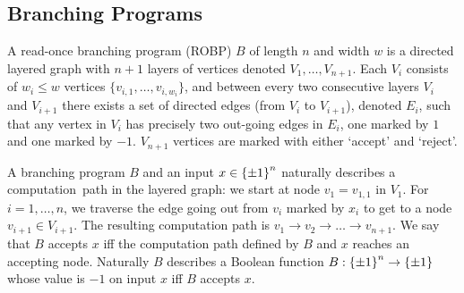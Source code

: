 
	



\subsection{Branching Programs}
A {\sf read-once branching program (ROBP)} $B$ of {\sf length} $n$ and {\sf width} $w$ is a directed layered graph with $n+1$ layers of vertices denoted $V_1, \ldots, V_{n+1}$.  Each $V_i$ consists of $w_i \le w$ vertices $\{v_{i,1}, \ldots, v_{i,w_i}\}$, and between every two consecutive layers $V_i$ and $V_{i+1}$ there exists a set of directed edges (from $V_i$ to $V_{i+1}$), denoted $E_i$, such that any vertex in $V_i$ has precisely two out-going edges in $E_i$, one marked by $1$ and one marked by $-1$. %
$V_{n+1}$  vertices are marked with either `accept' and `reject'.

A branching program $B$ and an input $x\in {\{\pm1\}}^n$ naturally describes a {\sf computation~path} in the layered graph:
we start at node $v_1 = v_{1,1}$ in $V_1$.
For $i=1, \ldots, n$, we traverse the edge going out from $v_i$ marked by $x_i$ to get to a node $v_{i+1} \in V_{i+1}$.
The resulting computation path is $v_1 \to v_2 \to \ldots \to v_{n+1}$.
We say that $B$ accepts $x$ iff the computation path defined by $B$ and $x$ reaches an accepting node. Naturally $B$ describes a Boolean function $B:{\{\pm1\}}^n \to {\{\pm1\}}$ whose value is $-1$ on input $x$ iff $B$ accepts $x$.

